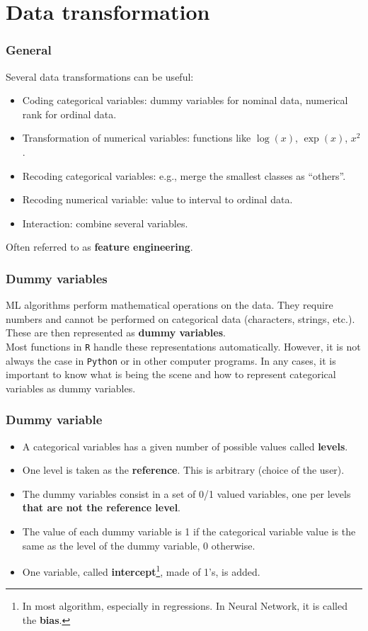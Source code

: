 \section{Data transformation}
\begin{frame}
\frametitle{General}
Several data transformations can be useful:
\begin{itemize}
\item Coding categorical variables: dummy variables for nominal data, numerical rank for ordinal data.
\item Transformation of numerical variables: functions like $\log(x)$, $\exp(x)$, $x^2$. 
\item Recoding categorical variables: e.g., merge the smallest classes as ``others''.
\item Recoding numerical variable: value to interval to ordinal data.
\item Interaction: combine several variables.
\end{itemize} 
Often referred to as {\bf feature engineering}.
\end{frame}
\begin{frame}
\frametitle{Dummy variables}
ML algorithms perform mathematical operations on the data. They require numbers and cannot be performed on categorical data (characters, strings, etc.). These are then represented as {\bf dummy variables}. \\
\vspace{0.3cm}
Most functions in {\tt R} handle these representations automatically. However, it is not always the case in {\tt Python} or in other computer programs. In any cases, it is important to know what is being the scene and how to represent categorical variables as dummy variables.
\end{frame}
\begin{frame}
\frametitle{Dummy variable}
\begin{itemize}
\item A categorical variables has a given number of possible values called {\bf levels}.
\item One level is taken as the {\bf reference}. This is arbitrary (choice of the user).
\item The dummy variables consist in a set of 0/1 valued variables, one per levels {\bf that are not the reference level}. 
\item The value of each dummy variable is 1 if the categorical variable value is the same as the level of the dummy variable, 0 otherwise.
\item One variable, called {\bf intercept}\footnote{In most algorithm, especially in regressions. In Neural Network, it is called the {\bf bias}.}, made of 1's, is added.
\end{itemize}
\end{frame}
